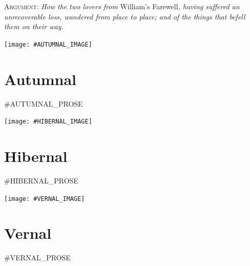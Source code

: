 \documentclass{amsbook}
\begin{document}
\thispagestyle{empty}
\vspace*{\fill}
\noindent \textsc{Argument:} \textit{How the two lovers from} William's Farewell\textit{, having suffered an unrecoverable loss, wandered from place to place; and of the things that befell them on their way.}
\vspace*{\fill}
\clearpage

\thispagestyle{empty}
\vspace*{\fill}
{\centering
\texttt{[image: \#AUTUMNAL\_IMAGE]}}
\vspace*{\fill}
\clearpage

\mainmatter

\chapter{Autumnal}

\renewcommand{\poemone}{
    #AUTUMNAL_POEM_1
}
\renewcommand{\poemtwo}{
    #AUTUMNAL_POEM_2
}
\renewcommand{\poemthree}{
    #AUTUMNAL_PRAYER
}
\initprintpoems
#AUTUMNAL_PROSE
\clearpage

\thispagestyle{empty}
\vspace*{\fill}
{\centering
\texttt{[image: \#HIBERNAL\_IMAGE]}}
\vspace*{\fill}
\clearpage

\chapter{Hibernal}

\renewcommand{\poemone}{
    #HIBERNAL_POEM_1
}
\renewcommand{\poemtwo}{
    #HIBERNAL_POEM_2
}
\renewcommand{\poemthree}{
    #HIBERNAL_PRAYER
}
\initprintpoems

#HIBERNAL_PROSE
\clearpage

\thispagestyle{empty}
\vspace*{\fill}
{\centering
\texttt{[image: \#VERNAL\_IMAGE]}}
\vspace*{\fill}
\clearpage

\chapter{Vernal}

\renewcommand{\poemone}{
    #VERNAL_POEM_1
}
\renewcommand{\poemtwo}{
    #VERNAL_POEM_2
}
\renewcommand{\poemthree}{
    #VERNAL_PRAYER
}
\initprintpoems

#VERNAL_PROSE
\clearpage
\end{document}
